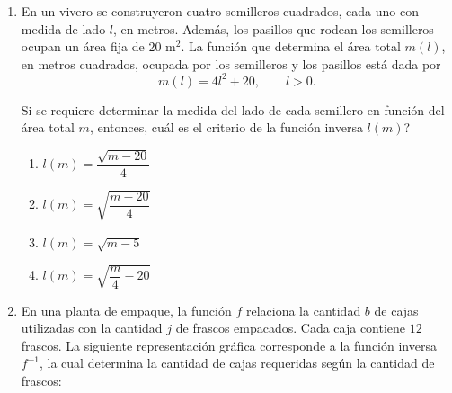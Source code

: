 \documentclass[12pt]{article}
\newcommand{\opcion}[2]{\item $#2$}
\newcommand{\puntotamanoestandar}{0.08cm}
\begin{document}
\newpage

\begin{enumerate}[label=\textbf{\arabic*.}, start=29, itemsep=1cm]

\Needspace{0.48\textheight}
\item
En un vivero se construyeron cuatro semilleros cuadrados, cada uno con medida de lado $l$, en metros. Adem\'as, los pasillos que rodean los semilleros ocupan un \'area fija de $20$ m$^2$. La funci\'on que determina el \'area total $m(l)$, en metros cuadrados, ocupada por los semilleros y los pasillos est\'a dada por
\[
  m(l)=4l^2+20, \qquad l>0.
\]

Si se requiere determinar la medida del lado de cada semillero en funci\'on del \'area total $m$, entonces, \textquestiondown cu\'al es el criterio de la funci\'on inversa $l(m)$?

\begin{enumerate}[label=\Alph*)]
  \opcion{A}{l(m)=\dfrac{\sqrt{m-20}}{4}}
  \opcion{B}{l(m)=\sqrt{\dfrac{m-20}{4}}}
  \opcion{C}{l(m)=\sqrt{m-5}}
  \opcion{D}{l(m)=\sqrt{\dfrac{m}{4}-20}}
\end{enumerate}

\Needspace{0.53\textheight}
\item
En una planta de empaque, la funci\'on $f$ relaciona la cantidad $b$ de cajas utilizadas con la cantidad $j$ de frascos empacados. Cada caja contiene $12$ frascos. La siguiente representaci\'on gr\'afica corresponde a la funci\'on inversa $f^{-1}$, la cual determina la cantidad de cajas requeridas seg\'un la cantidad de frascos:

\begin{center}
\end{center}


\end{enumerate}
\end{document}
